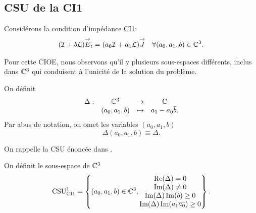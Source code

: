   \subsection{CSU de la CI1}

    Considérons la condition d’impédance \hyperlink{ci1}{CI1}:
    \begin{align}
    \label{eq:unicite:ci1}
      (\oI + b \LL) \vE_t = (a_0\oI + a_1 \LL) \vJ && \forall (a_0, a_1,b) \in \CC^3.
    \end{align}

    Pour cette CIOE, nous observons qu'il y plusieurs sous-espaces différents, inclus dans \(\CC^3\) qui conduisent à l'unicité de la solution du problème.


    On définit 
    \begin{equation}
      \label{eq:unicite:delta}
      \begin{matrix}
        \Delta: & \CC^3 &\rightarrow& \CC
        \\
        & (a_0,a_1,b) & \mapsto & a_1 - a_0\conj{b}.
      \end{matrix}
    \end{equation}
    Par abus de notation, on omet les variables \((a_0,a_1,b)\)
    \begin{equation}
       \Delta(a_0,a_1,b) \equiv \Delta.
    \end{equation}

    On rappelle la CSU énoncée dans \cite{stupfel_sufficient_2011}.

    \begin{defn}
      \label{def:csu:ci1-1}

      On définit le sous-espace de \(\CC^3\)
      \begin{equation*}
        \CSU[1]{CI1} = \left\lbrace 
        (a_0,a_1,b) \in \CC^3,
        \begin{matrix}
        \Re(\Delta) = 0
        \\
        \Im(\Delta) \not = 0
        \\
        \Im(\Delta)\Im(b) \ge 0
        \\
        \Im(\Delta )\Im(a_1\conj{a_0})\ge 0
        \end{matrix}
        \right\rbrace.
      \end{equation*}
    \end{defn}

